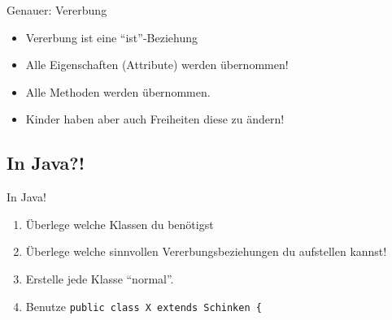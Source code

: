 \documentclass[18pt]{beamer}
\begin{document}
\begin{frame}{Genauer: Vererbung}
 \begin{itemize}
  \item Vererbung ist eine ``ist''-Beziehung
  \item Alle Eigenschaften (Attribute) werden übernommen!
  \item Alle Methoden werden übernommen.
  \item Kinder haben aber auch Freiheiten diese zu ändern!
 \end{itemize}
\end{frame}


\subsection{In Java?!}
\begin{frame}[fragile]{In Java!}
 \begin{enumerate}
  \item Überlege welche Klassen du benötigst
  \item Überlege welche sinnvollen Vererbungsbeziehungen du aufstellen kannst!
  \item Erstelle jede Klasse ``normal''.
  \item Benutze \verb|public class X extends Schinken {|
 \end{enumerate}
\end{frame}
\end{document}
